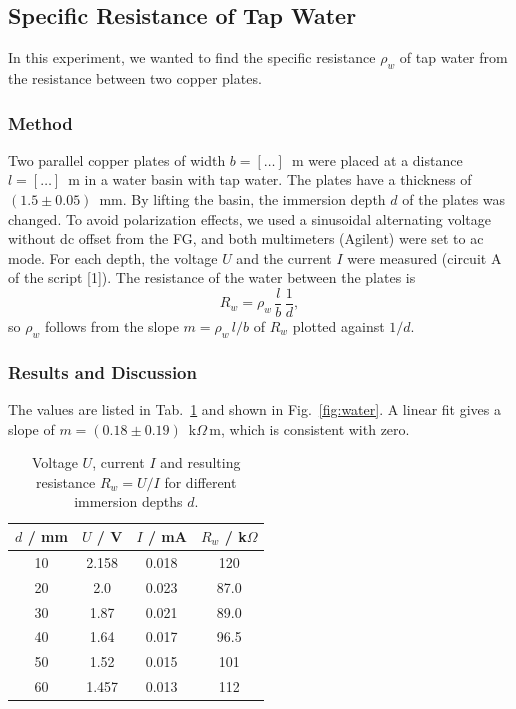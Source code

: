 \documentclass[12pt,a4paper]{article}
\begin{document}
\subsection{Specific Resistance of Tap Water}
In this experiment, we wanted to find the specific resistance $\rho_w$ of tap water from the resistance between two copper plates.

\subsubsection{Method}
Two parallel copper plates of width $b = [\ldots]$~m were placed at a distance $l = [\ldots]$~m in a water basin with tap water. The plates have a thickness of $(1.5 \pm 0.05)$~mm. By lifting the basin, the immersion depth $d$ of the plates was changed. To avoid polarization effects, we used a sinusoidal alternating voltage without dc offset from the FG, and both multimeters (Agilent) were set to ac mode. For each depth, the voltage $U$ and the current $I$ were measured (circuit A of the script [1]). The resistance of the water between the plates is
\begin{equation}
  R_w = \rho_w \,\frac{l}{b}\,\frac{1}{d},
\end{equation}
so $\rho_w$ follows from the slope $m = \rho_w\, l/b$ of $R_w$ plotted against $1/d$.

\subsubsection{Results and Discussion}
The values are listed in Tab.~\ref{tab:water} and shown in Fig.~\ref{fig:water}. A linear fit gives a slope of $m = (0.18 \pm 0.19)$~k$\Omega$\,m, which is consistent with zero.

\begin{table}[H]
  \centering
  \caption{Voltage $U$, current $I$ and resulting resistance $R_w = U/I$ for different immersion depths $d$.}
  \label{tab:water}
  \begin{tabular}{cccc}
    \hline
    $d$ / mm & $U$ / V & $I$ / mA & $R_w$ / k$\Omega$ \\
    \hline
    10 & 2.158 & 0.018 & 120 \\
    20 & 2.0   & 0.023 & 87.0 \\
    30 & 1.87  & 0.021 & 89.0 \\
    40 & 1.64  & 0.017 & 96.5 \\
    50 & 1.52  & 0.015 & 101 \\
    60 & 1.457 & 0.013 & 112 \\
    \hline
  \end{tabular}
\end{table}
\end{document}
